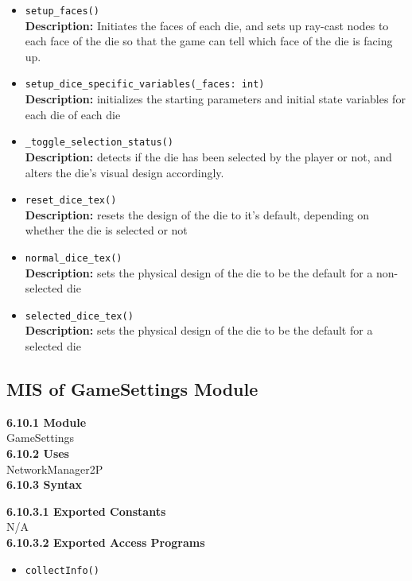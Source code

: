 \documentclass[12pt, titlepage]{article}
\begin{document}
\begin{itemize}
    \item \texttt{setup\_faces() }\\
	\textbf{Description:} Initiates the faces of each die, and sets up ray-cast nodes to each face of the die so that the game can tell which face of the die is facing up.
	\item \texttt{setup\_dice\_specific\_variables(\_faces: int) }\\
	\textbf{Description:} initializes the starting parameters and initial state variables for each die of each die 
	\item \texttt{\_toggle\_selection\_status() }\\
	\textbf{Description:} detects if the die has been selected by the player or not, and alters the die's visual design accordingly.
	\item \texttt{reset\_dice\_tex() }\\
	\textbf{Description:} resets the design of the die to it's default, depending on whether the die is selected or not
	\item \texttt{normal\_dice\_tex() }\\
	\textbf{Description:} sets the physical design of the die to be the default for a non-selected die
	\item \texttt{selected\_dice\_tex() }\\
	\textbf{Description:} sets the physical design of the die to be the default for a selected die	
	
	
\end{itemize}


\subsection{MIS of GameSettings Module}\label{GameSettings}
\textbf{6.10.1 Module}\\
 GameSettings\\

\noindent \textbf{6.10.2 Uses}\\
NetworkManager2P \\

\noindent \textbf{6.10.3 Syntax}

\noindent \textbf{6.10.3.1 Exported Constants}\\
N/A\\

\textbf{6.10.3.2 Exported Access Programs}
\begin{itemize}
	\item \texttt{collectInfo()}
	
	
\end{itemize}
\end{document}
